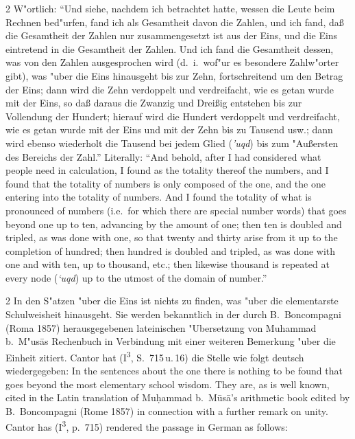 \documentclass[10pt,a4paper]{article}
\renewcommand{\switchcolumn}{\syncronize\nointerlineskip\columnbreak}
\newcommand{\enquote}[1]{``#1''}
\begin{document}
\begin{paracol}{2}
W"ortlich: \enquote{Und siehe, nachdem ich betrachtet hatte, wessen die Leute beim Rechnen bed"urfen, fand ich als Gesamtheit davon die Zahlen, und ich fand, da\ss{} die Gesamtheit der Zahlen nur zusammengesetzt ist aus der Eins, und die Eins eintretend in die Gesamtheit der Zahlen. Und ich fand die Gesamtheit dessen, was von den Zahlen ausgesprochen wird (d.\ i.\ wof"ur es besondere Zahlw"orter gibt), was "uber die Eins hinausgeht bis zur Zehn, fortschreitend um den Betrag der Eins; dann wird die Zehn verdoppelt und verdreifacht, wie es getan wurde mit der Eins, so da\ss{} daraus die Zwanzig und Drei\ss{}ig entstehen bis zur Vollendung der Hundert; hierauf wird die Hundert verdoppelt und verdreifacht, wie es getan wurde mit der Eins und mit der Zehn bis zu Tausend usw.; dann wird ebenso wiederholt die Tausend bei jedem Glied (\textit{'uqd}) bis zum "Au\ss{}ersten des Bereichs der Zahl.}
\switchcolumn
Literally: ``And behold, after I had considered what people need in calculation, I found as the totality thereof the numbers, and I found that the totality of numbers is only composed of the one, and the one entering into the totality of numbers. And I found the totality of what is pronounced of numbers (i.e.\ for which there are special number words) that goes beyond one up to ten, advancing by the amount of one; then ten is doubled and tripled, as was done with one, so that twenty and thirty arise from it up to the completion of hundred; then hundred is doubled and tripled, as was done with one and with ten, up to thousand, etc.; then likewise thousand is repeated at every node (\textit{`uqd}) up to the utmost of the domain of number.''
\end{paracol}

\begin{paracol}{2}
In den S"atzen "uber die Eins ist nichts zu finden, was "uber die elementarste Schulweisheit hinausgeht. Sie werden bekanntlich in der durch B.\ Boncompagni (Roma 1857) herausgegebenen lateinischen "Ubersetzung von Muhammad b.\ M"us\=as Rechenbuch in Verbindung mit einer weiteren Bemerkung "uber die Einheit zitiert. Cantor hat (I\textsuperscript{3}, S.\ 715\,u.\,16) die Stelle wie folgt deutsch wiedergegeben:
\switchcolumn
In the sentences about the one there is nothing to be found that goes beyond the most elementary school wisdom. They are, as is well known, cited in the Latin translation of Mu\d{h}ammad b.\ M\=us\=a's arithmetic book edited by B.\ Boncompagni (Rome 1857) in connection with a further remark on unity. Cantor has (I\textsuperscript{3}, p.\ 715) rendered the passage in German as follows:
\end{paracol}
\end{document}
